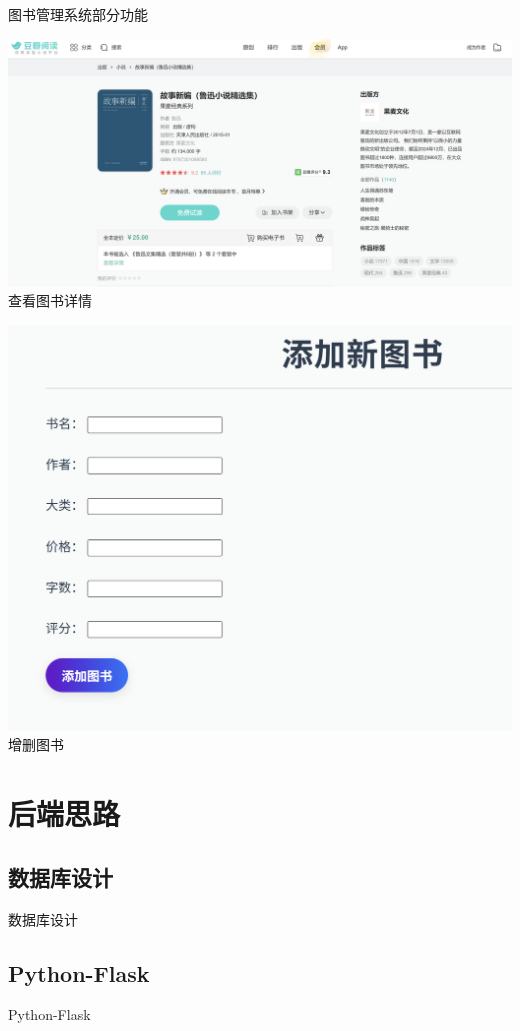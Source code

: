 \documentclass{ctexbeamer}
\begin{document}
\begin{frame}{图书管理系统部分功能}
  \vspace{0.5cm}

  \begin{minipage}{0.30\textwidth}
    \centering
    \includegraphics[width=\textwidth]{fig/book3.png} \\
    查看图书详情
  \end{minipage}
  \begin{minipage}{0.30\textwidth}
    \centering
    \includegraphics[width=\textwidth]{fig/book4.png} \\
    增删图书
  \end{minipage}
\end{frame}

\section{后端思路}

\subsection{数据库设计}
\begin{frame}{数据库设计}
  
\end{frame}

\subsection{Python-Flask}
\begin{frame}{Python-Flask}
  
\end{frame}
\end{document}
